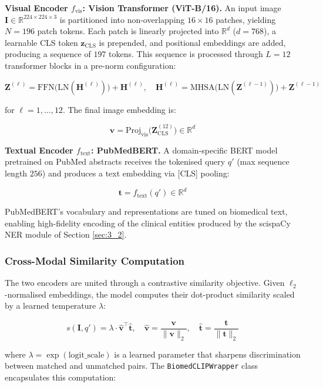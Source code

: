 \textbf{Visual Encoder $f_{\text{vis}}$: Vision Transformer (ViT-B/16).} An input image $\mathbf{I} \in \mathbb{R}^{224 \times 224 \times 3}$ is partitioned into non-overlapping $16 \times 16$ patches, yielding $N = 196$ patch tokens.  Each patch is linearly projected into $\mathbb{R}^d$ ($d = 768$), a learnable CLS token $\mathbf{z}_{\text{CLS}}$ is prepended, and positional embeddings are added, producing a sequence of $197$ tokens. This sequence is processed through $L = 12$ transformer blocks in a pre-norm configuration:

$$
\mathbf{Z}^{(\ell)} = \text{FFN}\!\bigl(\text{LN}(\mathbf{H}^{(\ell)})\bigr) + \mathbf{H}^{(\ell)}, \quad \mathbf{H}^{(\ell)} = \text{MHSA}\!\bigl(\text{LN}(\mathbf{Z}^{(\ell-1)})\bigr) + \mathbf{Z}^{(\ell-1)}
$$

for $\ell = 1, \ldots, 12$. The final image embedding is:

$$
\mathbf{v} = \text{Proj}_{\text{vis}}\!\bigl(\mathbf{Z}^{(12)}_{\text{CLS}}\bigr) \in \mathbb{R}^d
$$

\textbf{Textual Encoder $f_{\text{text}}$: PubMedBERT.} A domain-specific BERT model pretrained on PubMed abstracts receives the tokenised query $q'$ (max sequence length $256$) and produces a text embedding via [CLS] pooling:

$$
\mathbf{t} = f_{\text{text}}(q') \in \mathbb{R}^d
$$

PubMedBERT's vocabulary and representations are tuned on biomedical text, enabling high-fidelity encoding of the clinical entities produced by the scispaCy NER module of Section \ref{sec:3_2}.

\subsubsection{Cross-Modal Similarity Computation}
\label{sec:3_3_1_2}

The two encoders are united through a contrastive similarity objective. Given $\ell_2$-normalised embeddings, the model computes their dot-product similarity scaled by a learned temperature $\lambda$:

$$
s(\mathbf{I}, q') = \lambda \cdot \hat{\mathbf{v}}^{\top} \hat{\mathbf{t}}, \quad \hat{\mathbf{v}} = \frac{\mathbf{v}}{\|\mathbf{v}\|_2}, \quad \hat{\mathbf{t}} = \frac{\mathbf{t}}{\|\mathbf{t}\|_2}
$$

where $\lambda = \exp(\text{logit\_scale})$ is a learned parameter that sharpens discrimination between matched and unmatched pairs. The \texttt{BiomedCLIPWrapper} class encapsulates this computation:

